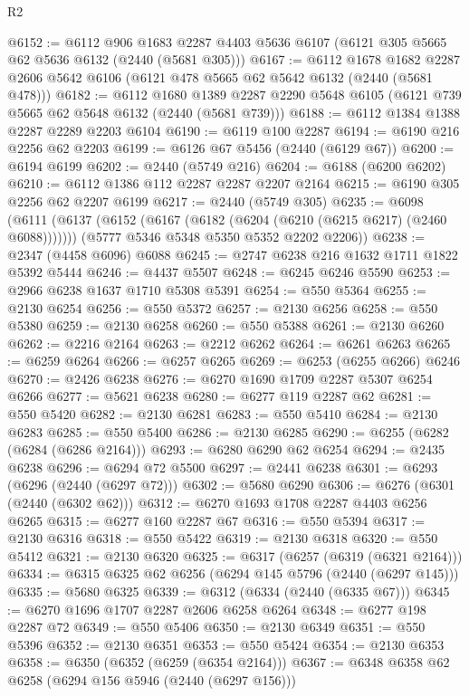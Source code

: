 \begin{lexlean}{R2}
\begin{coremodule}
@6152 := @6112
    @906
    @1683
    @2287
    @4403
    @5636
    @6107
    (@6121 @305 @5665 @62 @5636 @6132 (@2440 (@5681 @305)))
@6167 := @6112
    @1678
    @1682
    @2287
    @2606
    @5642
    @6106
    (@6121 @478 @5665 @62 @5642 @6132 (@2440 (@5681 @478)))
@6182 := @6112
    @1680
    @1389
    @2287
    @2290
    @5648
    @6105
    (@6121 @739 @5665 @62 @5648 @6132 (@2440 (@5681 @739)))
@6188 := @6112 @1384 @1388 @2287 @2289 @2203 @6104
@6190 := @6119 @100 @2287
@6194 := @6190 @216 @2256 @62 @2203
@6199 := @6126 @67 @5456 (@2440 (@6129 @67))
@6200 := @6194 @6199
@6202 := @2440 (@5749 @216)
@6204 := @6188 (@6200 @6202)
@6210 := @6112 @1386 @112 @2287 @2287 @2207 @2164
@6215 := @6190 @305 @2256 @62 @2207 @6199
@6217 := @2440 (@5749 @305)
@6235 := @6098
    (@6111
      (@6137 (@6152 (@6167 (@6182 (@6204 (@6210 (@6215 @6217) (@2460 @6088)))))))
      (@5777 @5346 @5348 @5350 @5352 @2202 @2206))
@6238 := @2347 (@4458 @6096) @6088
@6245 := @2747 @6238 @216 @1632 @1711 @1822 @5392 @5444
@6246 := @4437 @5507
@6248 := @6245 @6246 @5590
@6253 := @2966 @6238 @1637 @1710 @5308 @5391
@6254 := @550 @5364
@6255 := @2130 @6254
@6256 := @550 @5372
@6257 := @2130 @6256
@6258 := @550 @5380
@6259 := @2130 @6258
@6260 := @550 @5388
@6261 := @2130 @6260
@6262 := @2216 @2164
@6263 := @2212 @6262
@6264 := @6261 @6263
@6265 := @6259 @6264
@6266 := @6257 @6265
@6269 := @6253 (@6255 @6266) @6246
@6270 := @2426 @6238
@6276 := @6270 @1690 @1709 @2287 @5307 @6254 @6266
@6277 := @5621 @6238
@6280 := @6277 @119 @2287 @62
@6281 := @550 @5420
@6282 := @2130 @6281
@6283 := @550 @5410
@6284 := @2130 @6283
@6285 := @550 @5400
@6286 := @2130 @6285
@6290 := @6255 (@6282 (@6284 (@6286 @2164)))
@6293 := @6280 @6290 @62 @6254
@6294 := @2435 @6238
@6296 := @6294 @72 @5500
@6297 := @2441 @6238
@6301 := @6293 (@6296 (@2440 (@6297 @72)))
@6302 := @5680 @6290
@6306 := @6276 (@6301 (@2440 (@6302 @62)))
@6312 := @6270 @1693 @1708 @2287 @4403 @6256 @6265
@6315 := @6277 @160 @2287 @67
@6316 := @550 @5394
@6317 := @2130 @6316
@6318 := @550 @5422
@6319 := @2130 @6318
@6320 := @550 @5412
@6321 := @2130 @6320
@6325 := @6317 (@6257 (@6319 (@6321 @2164)))
@6334 := @6315 @6325 @62 @6256 (@6294 @145 @5796 (@2440 (@6297 @145)))
@6335 := @5680 @6325
@6339 := @6312 (@6334 (@2440 (@6335 @67)))
@6345 := @6270 @1696 @1707 @2287 @2606 @6258 @6264
@6348 := @6277 @198 @2287 @72
@6349 := @550 @5406
@6350 := @2130 @6349
@6351 := @550 @5396
@6352 := @2130 @6351
@6353 := @550 @5424
@6354 := @2130 @6353
@6358 := @6350 (@6352 (@6259 (@6354 @2164)))
@6367 := @6348 @6358 @62 @6258 (@6294 @156 @5946 (@2440 (@6297 @156)))

\end{coremodule}
\end{lexlean}
